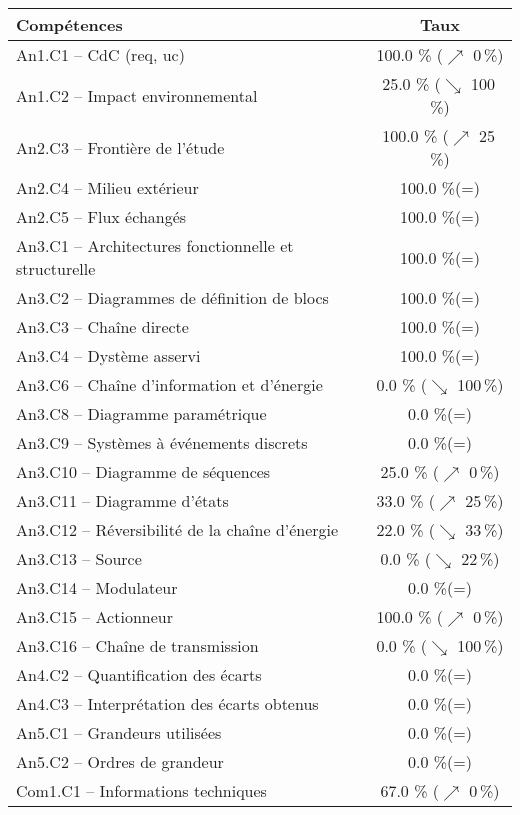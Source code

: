\footnotesize 
\begin{center} 
\begin{tabular}{|p{.7\linewidth}|c|} 
\hline 
Compétences  & Taux \\ \hline \hline 
An1.C1 -- CdC (req, uc)&100.0 \% ($\nearrow$ 0\,\%)\\ \hline 
An1.C2 -- Impact environnemental&25.0 \% ($\searrow$ 100\,\%)\\ \hline 
An2.C3 -- Frontière de l’étude&100.0 \% ($\nearrow$ 25\,\%)\\ \hline 
An2.C4 -- Milieu extérieur&100.0 \%(=)\\ \hline 
An2.C5 -- Flux échangés&100.0 \%(=)\\ \hline 
An3.C1 -- Architectures fonctionnelle et structurelle&100.0 \%(=)\\ \hline 
An3.C2 -- Diagrammes de définition de blocs&100.0 \%(=)\\ \hline 
An3.C3 -- Chaîne directe&100.0 \%(=)\\ \hline 
An3.C4 -- Dystème asservi&100.0 \%(=)\\ \hline 
An3.C6 -- Chaîne d’information et d'énergie&0.0 \% ($\searrow$ 100\,\%)\\ \hline 
An3.C8 -- Diagramme paramétrique&0.0 \%(=)\\ \hline 
An3.C9 -- Systèmes à événements discrets&0.0 \%(=)\\ \hline 
An3.C10 -- Diagramme de séquences&25.0 \% ($\nearrow$ 0\,\%)\\ \hline 
An3.C11 -- Diagramme d’états&33.0 \% ($\nearrow$ 25\,\%)\\ \hline 
An3.C12 -- Réversibilité de la chaîne d’énergie&22.0 \% ($\searrow$ 33\,\%)\\ \hline 
An3.C13 -- Source&0.0 \% ($\searrow$ 22\,\%)\\ \hline 
An3.C14 -- Modulateur&0.0 \%(=)\\ \hline 
An3.C15 -- Actionneur&100.0 \% ($\nearrow$ 0\,\%)\\ \hline 
An3.C16 -- Chaîne de transmission&0.0 \% ($\searrow$ 100\,\%)\\ \hline 
An4.C2 -- Quantification des écarts&0.0 \%(=)\\ \hline 
An4.C3 -- Interprétation des écarts obtenus&0.0 \%(=)\\ \hline 
An5.C1 -- Grandeurs utilisées &0.0 \%(=)\\ \hline 
An5.C2 -- Ordres de grandeur&0.0 \%(=)\\ \hline 
Com1.C1 -- Informations techniques&67.0 \% ($\nearrow$ 0\,\%)\\ \hline 

\end{tabular}
\end{center}

